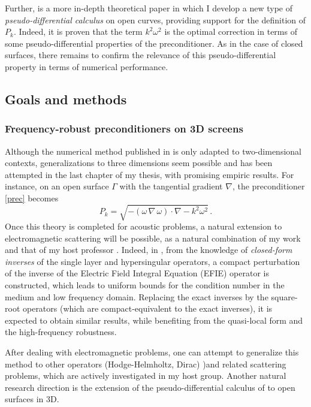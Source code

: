 \documentclass[]{report}
\begin{document}
Further, \cite{averseng2019pseudo} is a more in-depth theoretical paper in which I develop
a new type of \emph{pseudo-differential calculus} on open curves, providing support for the
definition of $P_k$. Indeed, it is proven that the term $k^2 \omega^2$ is the optimal
correction in terms of some pseudo-differential properties of the preconditioner. As in
the case of closed surfaces, there remains to confirm the relevance of this
pseudo-differential property in terms of numerical performance.



\subsection{Goals and methods}

\subsubsection*{Frequency-robust preconditioners on 3D screens}

Although the numerical method published in \cite{alouges2019new} is only adapted to
two-dimensional contexts, generalizations to three dimensions seem possible and has been
attempted in the last chapter of my thesis, with promising empiric results. For instance,
on an open surface $\Gamma$ with the tangential gradient $\nabla$, the preconditioner
\eqref{prec} becomes
\[P_k = \sqrt{-(\omega\,\nabla \,\omega) \cdot \nabla - k^2 \omega^2}\,.\] Once this
theory is completed for acoustic problems, a natural extension to electromagnetic
scattering will be possible, as a natural combination of my work and that of my host
professor \cite{hiptmair2019preconditioning}. Indeed, in
\cite{hiptmair2019preconditioning}, from the knowledge of \textit{closed-form inverses} of
the single layer and hypersingular operators, a compact perturbation of the inverse of the
Electric Field Integral Equation (EFIE) operator is constructed, which leads to uniform
bounds for the condition number in the medium and low frequency domain. Replacing the
exact inverses by the square-root operators (which are compact-equivalent to the exact
inverses), it is expected to obtain similar results, while benefiting from the quasi-local
form and the high-frequency robustness.

After dealing with electromagnetic problems, one can attempt to generalize this method to
other operators (Hodge-Helmholtz, Dirac) )and related scattering problems, which are
actively investigated in my host group.  Another natural research direction is the extension of the
pseudo-differential calculus of \cite{averseng2019pseudo} to open surfaces in 3D.
\end{document}
